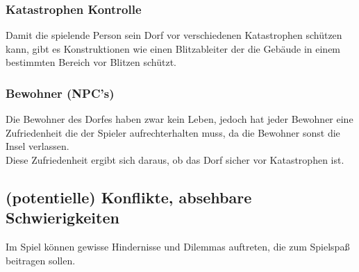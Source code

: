 \documentclass[paper=A4,pagesize=auto,12pt,headinclude=true,footinclude=true,BCOR=0mm,DIV=calc]{scrartcl}
\newcommand{\sectionspace}{
	\vspace{0.5cm}
}
\begin{document}
\subsubsection{Katastrophen Kontrolle}
Damit die spielende Person sein Dorf vor verschiedenen Katastrophen schützen kann, gibt es Konstruktionen wie einen Blitzableiter der die Gebäude in einem bestimmten Bereich vor Blitzen schützt.

\subsubsection{Bewohner (NPC's)}
Die Bewohner des Dorfes haben zwar kein Leben, jedoch hat jeder Bewohner eine Zufriedenheit die der Spieler aufrechterhalten muss, da die Bewohner sonst die Insel verlassen.\\
Diese Zufriedenheit ergibt sich daraus, ob das Dorf sicher vor Katastrophen ist.

\sectionspace
\subsection{(potentielle) Konflikte, absehbare Schwierigkeiten}\label{sec:Konflikte}

Im Spiel können gewisse Hindernisse und Dilemmas auftreten, die zum Spielspaß beitragen sollen.\\
\end{document}
